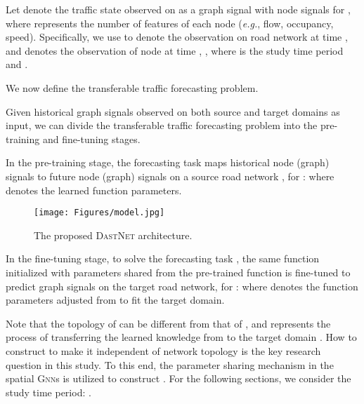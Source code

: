 \documentclass[sigconf]{acmart}
\theoremstyle{definition}
\begin{document}
\begin{definition}
Let  denote the traffic state observed on  as a graph signal with node signals  for , where  represents the number of features of each node ({\em e.g.}, flow, occupancy, speed).  Specifically, we use  to denote the observation on road network  at time , and  denotes the observation of node  at time , , where  is the study time period and .
\end{definition}








We now define the transferable traffic forecasting problem.

\begin{definition}



Given historical graph signals observed on both source and target domains as input, we can divide the transferable traffic forecasting problem into the pre-training and fine-tuning stages.  





In the pre-training stage, the forecasting task  maps  historical node (graph) signals to future  node (graph) signals on a source road network , for :
where  denotes the learned function parameters.



\begin{figure*}[t]
    \centering
    \texttt{[image: Figures/model.jpg]}
    \caption{The proposed \textsc{DastNet} architecture.}
    \label{fig:model}
\end{figure*}

In the fine-tuning stage, to solve the forecasting task , the same function initialized with parameters  shared from the pre-trained function is fine-tuned to predict graph signals on the target road network, for :
where  denotes the function parameters adjusted from  to fit the target domain. 
\end{definition}
Note that the topology of  can be different from that of , and  represents the process of transferring the learned knowledge  from  to the target domain . How to construct  to make it independent of network topology is the key research question in this study. To this end, the parameter sharing mechanism in the spatial \textsc{Gnn}s is utilized to construct  \cite{zhou2020graph}. For the following sections, we consider the study time period: . 
\end{document}
